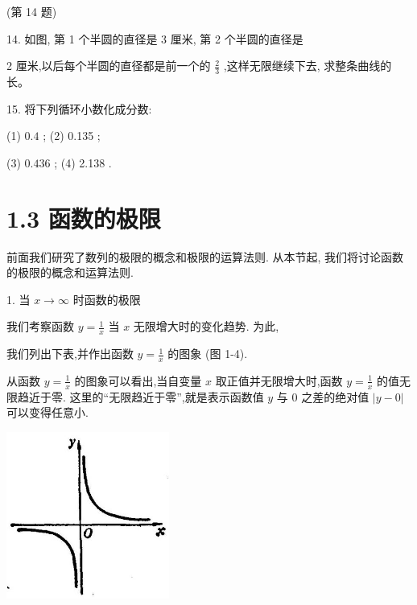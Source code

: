 \documentclass[10pt]{article}
\begin{document}
(第 14 题)

14. 如图, 第 1 个半圆的直径是 3 厘米, 第 2 个半圆的直径是

2 厘米,以后每个半圆的直径都是前一个的 \(\frac{2}{3}\) ,这样无限继续下去, 求整条曲线的长。

15. 将下列循环小数化成分数:

(1) \({0.4}\) ; (2) 0.135 ;

(3) \({0.436}\) ; (4) 2.138 .

\section*{1.3 函数的极限}

前面我们研究了数列的极限的概念和极限的运算法则. 从本节起, 我们将讨论函数的极限的概念和运算法则.

1. 当 \(x \rightarrow \infty\) 时函数的极限

我们考察函数 \(y = \frac{1}{x}\) 当 \(x\) 无限增大时的变化趋势. 为此,

我们列出下表,并作出函数 \(y = \frac{1}{x}\) 的图象 (图 1-4).

\begin{center}
\end{center}

从函数 \(y = \frac{1}{x}\) 的图象可以看出,当自变量 \(x\) 取正值并无限增大时,函数 \(y = \frac{1}{x}\) 的值无限趋近于零. 这里的“无限趋近于零”,就是表示函数值 \(y\) 与 0 之差的绝对值 \(\left| {y - 0}\right|\) 可以变得任意小.

\begin{center}
\includegraphics[max width=0.4\textwidth]{images/01912c18-5c3f-733d-b775-749ba9897a9d_21_654074.jpg}
\end{center}
\end{document}
